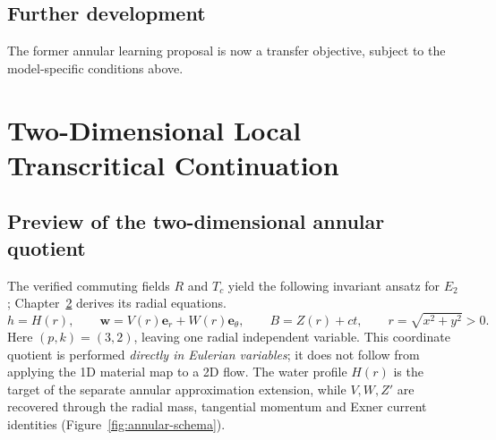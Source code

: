 \documentclass[12pt,a4paper,oneside]{report}
\numberwithin{equation}{chapter}
\theoremstyle{remark}\newtheorem{remark}[theorem]{Remark}
\begin{document}
\section{Further development}\label{sec:planned-ML}The former annular learning proposal is now a transfer objective, subject to the model-specific conditions above.
\appendix
\chapter{Two-Dimensional Local Transcritical Continuation}\label{ch:continuation}
\section{Preview of the two-dimensional annular quotient}
The verified commuting fields $R$ and $T_c$ yield the following invariant
ansatz for $E_2$; Chapter~\ref{ch:continuation} derives its radial equations.
\begin{equation}\label{eq:annular-preview}
 h=H(r),\qquad
 \mathbf w=V(r)\mathbf e_r+W(r)\mathbf e_\theta,\qquad
 B=Z(r)+ct,\qquad r=\sqrt{x^2+y^2}>0.
\end{equation}
Here $(p,k)=(3,2)$, leaving one radial independent variable. This
coordinate quotient is performed \emph{directly in Eulerian variables}; it
does not follow from applying the 1D material map to a 2D flow. The water
profile $H(r)$ is the target of the separate annular approximation extension,
while $V,W,Z'$ are recovered through the radial mass, tangential momentum and
Exner current identities (Figure~\ref{fig:annular-schema}).
\end{document}
